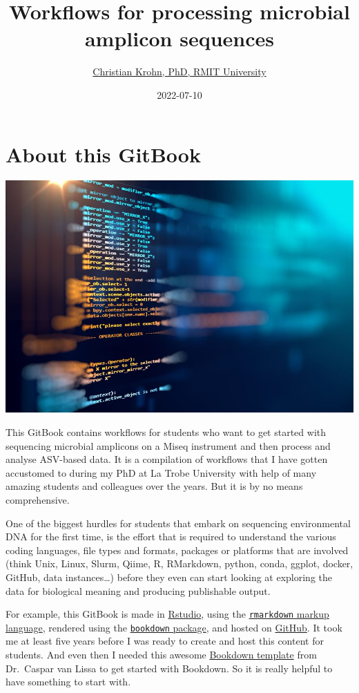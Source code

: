 \documentclass[
]{book}
\title{Workflows for processing microbial amplicon sequences}
\author{\href{https://www.rmit.edu.au/contact/staff-contacts/academic-staff/k/krohn---christian}{Christian Krohn, PhD, RMIT University}}
\date{2022-07-10}
\begin{document}
\maketitle

{
\setcounter{tocdepth}{1}
\tableofcontents
}
\hypertarget{about}{%
\chapter{About this GitBook}\label{about}}

\includegraphics{./img/data.jpeg}

This GitBook contains workflows for students who want to get started with sequencing microbial amplicons on a Miseq instrument and then process and analyse ASV-based data. It is a compilation of workflows that I have gotten accustomed to during my PhD at La Trobe University with help of many amazing students and colleagues over the years. But it is by no means comprehensive.

One of the biggest hurdles for students that embark on sequencing environmental DNA for the first time, is the effort that is required to understand the various coding languages, file types and formats, packages or platforms that are involved (think Unix, Linux, Slurm, Qiime, R, RMarkdown, python, conda, ggplot, docker, GitHub, data instances\ldots) before they even can start looking at exploring the data for biological meaning and producing publishable output.

For example, this GitBook is made in \href{https://rstudio.com}{Rstudio}, using the \href{https://rstudio.com/wp-content/uploads/2016/03/rmarkdown-cheatsheet-2.0.pdf}{\texttt{rmarkdown} markup language}, rendered using the \href{https://bookdown.org/yihui/bookdown/get-started.html}{\texttt{bookdown} package}, and hosted on \href{https://github.com/}{GitHub}. It took me at least five years before I was ready to create and host this content for students. And even then I needed this awesome \href{https://cjvanlissa.github.io/gitbook-demo/index.html}{Bookdown template} from Dr.~Caspar van Lissa to get started with Bookdown. So it is really helpful to have something to start with.
\end{document}
